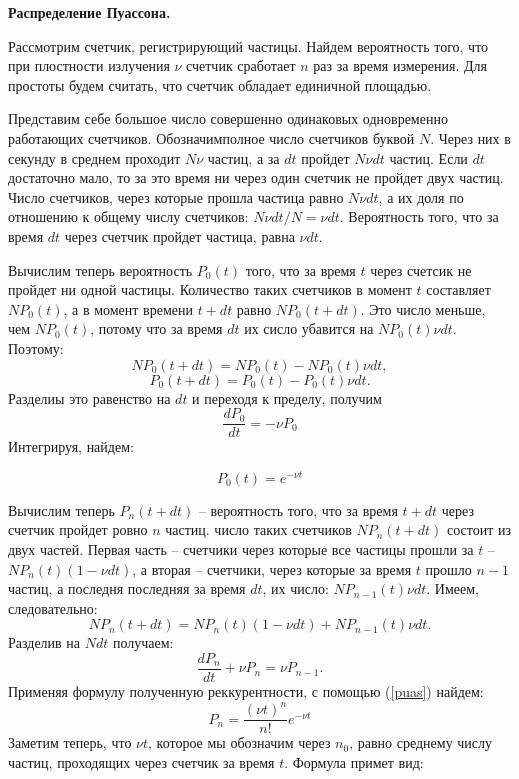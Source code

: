 \documentclass[a4paper, 12pt]{article}
\begin{document}
	\begin{center}
		\textbf{Распределение Пуассона.}
	\end{center}

	Рассмотрим счетчик, регистрирующий частицы. Найдем вероятность того, что при плостности излучения $\nu$ счетчик сработает $n$ раз за время измерения. Для простоты будем считать, что счетчик обладает единичной площадью.
	
	Представим себе большое число совершенно одинаковых одновременно работающих счетчиков. Обозначимполное число счетчиков буквой $N$. Через них в секунду в среднем проходит $N\nu$ частиц, а за $dt$ пройдет $N\nu dt$ частиц. Если $dt$ достаточно мало, то за это время ни через один счетчик не пройдет двух частиц. Число счетчиков, через которые прошла частица равно $N\nu dt$, а их доля по отношению к общему числу счетчиков: $N\nu dt/N = \nu dt$. Вероятность того, что за время $dt$ через счетчик пройдет частица, равна $\nu dt$.
	
	Вычислим теперь вероятность $P_0(t)$ того, что за время $t$ через счетсик не пройдет ни одной частицы. Количество таких счетчиков в момент $t$ составляет $NP_0 (t)$, а в момент времени $t+dt$ равно $NP_0 (t+dt)$. Это число меньше, чем $NP_0 (t)$, потому что за время $dt$ их сисло убавится на $NP_0 (t)\nu dt$. Поэтому: \[NP_0 (t+dt) = NP_0(t) - NP_0 (t)\nu dt,\] \[P_0 (t+dt) = P_0(t) - P_0 (t)\nu dt.\] Разделиы это равенство на $dt$ и переходя к пределу, получим \[ \frac{dP_0}{dt} = -\nu P_0 \]  Интегрируя, найдем: 
	
	\begin{equation}
		P_0 (t) = e^{-\nu t}
		\label{puas}
	\end{equation}
	
	Вычислим теперь $P_n (t+dt)$ -- вероятность того, что за время $t+dt$ через счетчик пройдет ровно $n$ частиц. число таких счетчиков $NP_n(t+dt)$ состоит из двух частей. Первая часть -- счетчики через которые все частицы прошли за $t$ -- $NP_n(t)(1-\nu dt)$, а вторая -- счетчики, через которые за время $t$ прошло $n-1$ частиц, а последня последняя за время $dt$, их число: $NP_{n-1}(t)\nu dt$. Имеем, следовательно: \[NP_n(t+dt) = NP_n(t)(1-\nu dt) + NP_{n-1}(t)\nu dt.\]
	Разделив на $Ndt$ получаем:\[ \frac{dP_n}{dt} + \nu P_n = \nu P_{n-1}. \]
	Применяя формулу полученную реккурентности, с помощью (\ref{puas}) найдем: \[ P_n = \frac{(\nu t)^n}{n!}e^{-\nu t} \] 
	Заметим теперь, что $\nu t $, которое мы обозначим через $n_0$, равно среднему числу частиц, проходящих через счетчик за время $t$. Формула примет вид:
	
\end{document}
